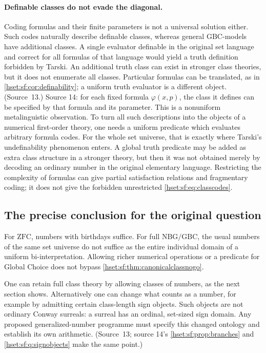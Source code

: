 \documentclass[11pt,letterpaper]{article}
\theoremstyle{definition}
\theoremstyle{remark}
\newcommand{\ZFC}{\mathrm{ZFC}}
\newcommand{\GBC}{\mathrm{GBC}}
\newcommand{\NBG}{\mathrm{NBG}}
\begin{document}
\paragraph{Definable classes do not evade the diagonal.} Coding formulas and their
finite parameters is not a universal solution either. Such codes naturally describe
definable classes, whereas general $\GBC$-models have additional classes. A single
evaluator definable in the original set language and correct for all formulas of
that language would yield a truth definition forbidden by Tarski. An additional
truth class can exist in stronger class theories, but it does not enumerate all
classes. Particular formulas can be translated, as in
\cref{hset:sf:cor:definability}; a uniform truth evaluator is a different object.
(Source~13.) Source 14: for each fixed formula $\varphi(x,p)$, the class it defines
can be specified by that formula and its parameter. This is a nonuniform
metalinguistic observation. To turn all such descriptions into the objects of a
numerical first-order theory, one needs a uniform predicate which evaluates
arbitrary formula codes. For the whole set universe, that is exactly where Tarski's
undefinability phenomenon enters. A global truth predicate may be added as extra
class structure in a stronger theory, but then it was not obtained merely by
decoding an ordinary number in the original elementary language. Restricting the
complexity of formulas can give partial satisfaction relations and fragmentary
coding; it does not give the forbidden unrestricted \eqref{hset:sf:eq:classcodes}.

\subsection{The precise conclusion for the original question}

For $\ZFC$, numbers with birthdays suffice. For full $\NBG/\GBC$, the usual numbers
of the same set universe do not suffice as the entire individual domain of a
uniform bi-interpretation. Allowing richer numerical operations or a predicate for
Global Choice does not bypass \cref{hset:sf:thm:canonicalclassnogo}.

One can retain full class theory by allowing classes of numbers, as the next section
shows. Alternatively one can change what counts as a number, for example by
admitting certain class-length sign objects. Such objects are not ordinary Conway
surreals: a surreal has an ordinal, set-sized sign domain. Any proposed
generalized-number programme must specify this changed ontology and establish its
own arithmetic. (Source~13; source 14's \cref{hset:sf:prop:branches} and
\cref{hset:sf:q:signobjects} make the same point.)
\end{document}
